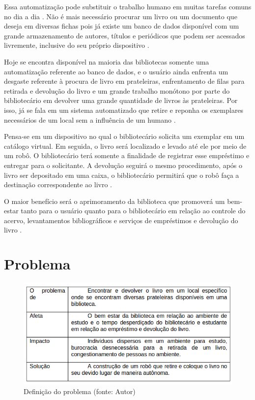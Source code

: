 Essa automatização pode substituir o trabalho humano em muitas tarefas comuns no dia a dia \cite{fraga2011}. Não é mais necessário procurar um livro ou um documento que deseja em diversas fichas pois já existe um banco de dados disponível com um grande armazenamento de autores, títulos e periódicos que podem ser acessados livremente, inclusive do seu próprio dispositivo \cite{santana2015}.

Hoje se encontra disponível na maioria das bibliotecas somente uma automatização referente ao banco de dados\cite{santana2015}, e o usuário ainda enfrenta um desgaste referente à procura de livro em prateleiras, enfrentamento de filas para retirada e devolução do livro e um grande trabalho monótono por parte do bibliotecário em devolver uma grande quantidade de livros às prateleiras. Por isso, já se fala em um sistema automatizado que retire e reponha os exemplares necessários de um local sem a influência de um humano \cite{fraga2011}. 

Pensa-se em um dispositivo no qual o bibliotecário solicita um exemplar em um catálogo virtual. Em seguida, o livro será localizado e levado até ele por meio de um robô. O bibliotecário terá somente a finalidade de registrar esse empréstimo e entregar para o solicitante.  A devolução seguirá o mesmo procedimento, após o livro ser depositado em uma caixa, o bibliotecário permitirá que o robô faça a destinação correspondente ao livro \cite{fraga2011}.

O maior benefício será o aprimoramento da biblioteca que promoverá um bem-estar tanto para o usuário quanto para o bibliotecário em relação ao controle do acervo, levantamentos bibliográficos e serviços de empréstimos e devolução do livro \cite{fraga2011}. 

\section{Problema}

\begin{figure}[!h]
\centering
\includegraphics[scale=0.60, angle = 360]{figuras/tabela_1}
\caption[]{Definição do problema (fonte: Autor)}
\end{figure}
\FloatBarrier

